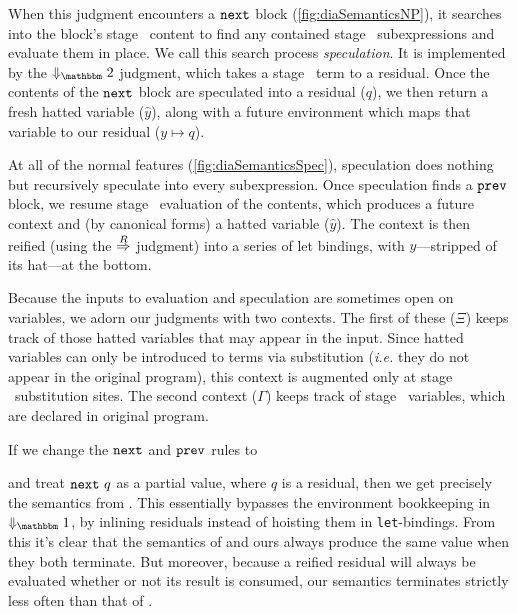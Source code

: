 When this judgment encounters a ${\tt next}$ block (\ref{fig:diaSemanticsNP}), it searches into the block's stage \bbtwo\ content to find any contained stage
\bbone\ subexpressions and evaluate them in place.  
We call this search process \emph{speculation}. It is implemented by the $\redtwosym$ judgment, which takes a stage \bbtwo\ term to a residual.
Once the contents of the ${\tt next}$ block are speculated into a residual ($q$), 
we then return a fresh hatted variable ($\hat y$), 
along with a future environment which maps that variable to our residual ($y \mapsto q$).

At all of the normal features (\ref{fig:diaSemanticsSpec}), speculation does nothing but recursively speculate into every subexpression.
Once speculation finds a ${\tt prev}$ block, we resume stage \bbone\ evaluation of the contents, which produces a future context and (by canonical forms) a hatted variable ($\hat y$).
The context is then reified (using the $\overset{R}\Rightarrow$ judgment) into a series of let bindings, with $y$---stripped of its hat---at the bottom.

Because the inputs to evaluation and speculation are sometimes open on variables, we adorn our judgments with two contexts.
The first of these ($\Xi$) keeps track of those hatted variables that may appear in the input.
Since hatted variables can only be introduced to terms via substitution ({\em i.e.} they do not appear in the original program), 
this context is augmented only at stage \bbone\ substitution sites.
The second context ($\Gamma$) keeps track of stage \bbtwo\ variables, which are declared in original program.

If we change the ${\tt next}$ and ${\tt prev}$ rules to 
and treat ${\tt next}~q$ as a partial value, where $q$ is a residual,
then we get precisely the semantics from \cite{davies96}. This essentially bypasses the
environment bookkeeping in $\redonesym$, by inlining residuals instead of
hoisting them in \verb|let|-bindings.
From this it's clear that the semantics of \cite{davies96} and ours always produce the same value when they both terminate.
But moreover, because a reified residual will always be evaluated whether or not its result is consumed, 
our semantics terminates strictly less often than that of \cite{davies96}.

